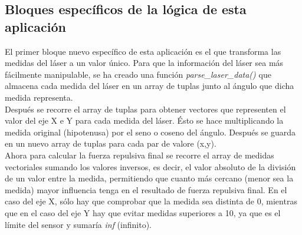 \subsection{Bloques específicos de la lógica de esta aplicación}
\label{subsec:spec_bloques_VFF}

El primer bloque nuevo específico de esta aplicación es el que transforma las medidas del láser a un valor único.
Para que la información del láser sea más fácilmente manipulable, se ha creado una función \textit{parse\_laser\_data()} que almacena cada medida del láser
en un array de tuplas junto al ángulo que dicha medida representa.\\

Después se recorre el array de tuplas para obtener vectores que representen el valor del eje X e Y para cada medida del láser. Ésto se hace multiplicando la medida
original (hipotenusa) por el seno o coseno del ángulo. Después se guarda en un nuevo array de tuplas para cada par de valore (x,y).\\

Ahora para calcular la fuerza repulsiva final se recorre el array de medidas vectoriales sumando los valores inversos, es decir, el valor absoluto de la división de un valor
entre la medida, permitiendo que cuanto más cercano (menor sea la medida) mayor influencia tenga en el resultado de fuerza repulsiva final. En el caso del eje X, sólo
hay que comprobar que la medida sea distinta de 0, mientras que en el caso del eje Y hay que evitar medidas superiores a 10, ya que es el límite del sensor y
sumaría \textit{inf} (infinito).

